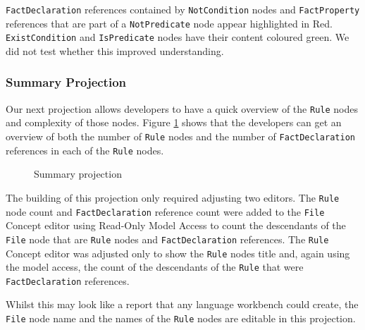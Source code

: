 \texttt{FactDeclaration} references contained by \texttt{NotCondition} nodes and \texttt{FactProperty} references that are part of a \texttt{NotPredicate} node appear highlighted in Red.
\texttt{ExistCondition} and \texttt{IsPredicate} nodes have their content coloured green.
We did not test whether this improved understanding.

\subsubsection{Summary Projection}

Our next projection allows developers to have a quick overview of the \texttt{Rule} nodes and complexity of those nodes.
Figure \ref{fig:summaryProjection} shows that the developers can get an overview of both the number of \texttt{Rule} nodes and the number of \texttt{FactDeclaration} references in each of the \texttt{Rule} nodes.

\begin{figure}
    \centering
    \caption{Summary projection}
    \label{fig:summaryProjection}
\end{figure}

The building of this projection only required adjusting two editors.
The \texttt{Rule} node count and \texttt{FactDeclaration} reference count were added to the \texttt{File} Concept editor using Read-Only Model Access to count the descendants of the \texttt{File} node that are \texttt{Rule} nodes and \texttt{FactDeclaration} references.
The \texttt{Rule} Concept editor was adjusted only to show the \texttt{Rule} nodes title and, again using the model access, the count of the descendants of the \texttt{Rule} that were \texttt{FactDeclaration} references.

Whilst this may look like a report that any language workbench could create, the \texttt{File} node name and the names of the \texttt{Rule} nodes are editable in this projection.

